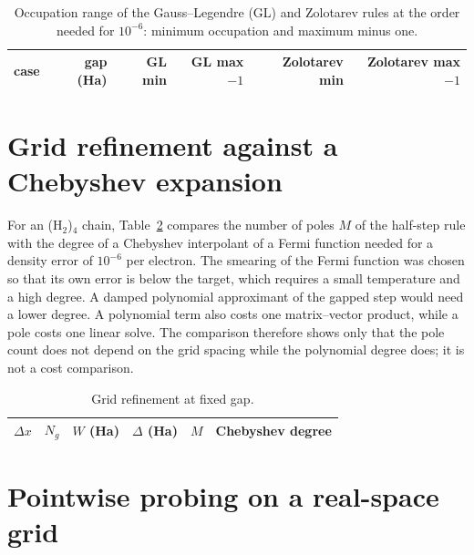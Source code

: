 \documentclass[aps,prb,onecolumn,superscriptaddress,floatfix]{revtex4-2}
\begin{document}
\begin{table}[h]
\caption{\label{tab:occ}Occupation range of the Gauss--Legendre (GL) and Zolotarev rules at the order needed for $10^{-6}$:
minimum occupation and maximum minus one.}
\begin{ruledtabular}
\begin{tabular}{lrrrrr}
case & gap (Ha) & GL min & GL max$-1$ & Zolotarev min & Zolotarev max$-1$ \\
\hline

\end{tabular}
\end{ruledtabular}
\end{table}

\section{Grid refinement against a Chebyshev expansion}

For an (H$_2$)$_4$ chain, Table~\ref{tab:grid} compares the number of poles $M$ of the half-step rule with the degree of a
Chebyshev interpolant of a Fermi function needed for a density error of $10^{-6}$ per electron. The smearing of the Fermi
function was chosen so that its own error is below the target, which requires a small temperature and a high degree. A
damped polynomial approximant of the gapped step would need a lower degree. A polynomial term also costs one matrix--vector
product, while a pole costs one linear solve. The comparison therefore shows only that the pole count does not depend on the
grid spacing while the polynomial degree does; it is not a cost comparison.

\begin{table}[h]
\caption{\label{tab:grid}Grid refinement at fixed gap.}
\begin{ruledtabular}
\begin{tabular}{rrrrrr}
$\Delta x$ & $N_g$ & $W$ (Ha) & $\Delta$ (Ha) & $M$ & Chebyshev degree \\
\hline

\end{tabular}
\end{ruledtabular}
\end{table}

\section{Pointwise probing on a real-space grid}
\end{document}
